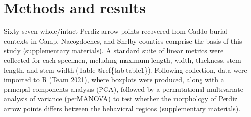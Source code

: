 \documentclass[smallextended]{svjour3}       %
\begin{document}
\hypertarget{methods-and-results}{%
\section{Methods and results}\label{methods-and-results}}

Sixty seven whole/intact Perdiz arrow points recovered from Caddo burial
contexts in Camp, Nacogdoches, and Shelby counties comprise the basis of
this study (\href{https://seldenlab.github.io/perdiz3/}{supplementary
materials}). A standard suite of linear metrics were collected for each
specimen, including maximum length, width, thickness, stem length, and
stem width (Table @ref\{tab:table1\}). Following collection, data were
imported to R (Team 2021), where boxplots were produced, along with a
principal components analysis (PCA), followed by a permutational
multivariate analysis of variance (perMANOVA) to test whether the
morphology of Perdiz arrow points differs between the behavioral regions
(\href{https://seldenlab.github.io/perdiz3/}{supplementary materials}).
\end{document}
